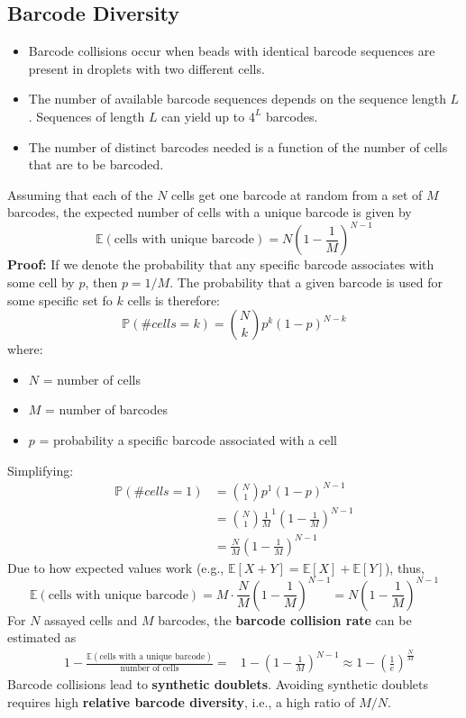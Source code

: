 \documentclass[10pt]{article}
\begin{document}
\subsection*{Barcode Diversity}
\begin{itemize}
    \item Barcode collisions occur when beads with identical barcode sequences are present in droplets with two different cells.
    \item The number of available barcode sequences depends on the sequence length $L$.  Sequences of length $L$ can yield up to $4^L$ barcodes.
    \item The number of distinct barcodes needed is a function of the number of cells that are to be barcoded.
\end{itemize}
Assuming that each of the $N$ cells get one barcode at random from a set of $M$ barcodes, the expected number of cells with a unique barcode is given by
\[\mathbb{E}(\text{cells with unique barcode}) = N \left(1 - \frac{1}{M}\right)^{N - 1}\]
\textbf{Proof:} If we denote the probability that any specific barcode associates with some cell by $p$, then $p = 1 / M$.  The probability that a given barcode is used for some specific set fo $k$ cells is therefore:
\[\mathbb{P}(\#cells = k) = {N \choose k} p^k(1 - p)^{N - k}\]
where:
\begin{itemize}
    \item $N$ = number of cells
    \item $M$ = number of barcodes
    \item $p$ = probability a specific barcode associated with a cell
\end{itemize}
Simplifying:
\begin{align*}
    \mathbb{P}(\#cells = 1) &= {N \choose 1} p^1 (1 - p)^{N - 1}\\
    &= {N \choose 1} {\frac{1}{M}}^1 \left(1 - \frac{1}{M}\right)^{N - 1}\\
    &= \frac{N}{M} \left(1 - \frac{1}{M}\right)^{N - 1}
\end{align*}
Due to how expected values work (e.g., $\mathbb{E}[X + Y] = \mathbb{E}[X] + \mathbb{E}[Y]$), thus,
\[\mathbb{E}(\text{cells with unique barcode}) = M \cdot \frac{N}{M} \left(1 - \frac{1}{M}\right)^{N - 1} = N\left(1 - \frac{1}{M}\right)^{N - 1}\]
For $N$ assayed cells and $M$ barcodes, the \textbf{barcode collision rate} can be estimated as
\begin{align*}
    & 1 - \frac{\mathbb{E}(\text{cells with a unique barcode})}{\text{number of cells}}
   =& 1 - \left(1 - \frac{1}{M}\right)^{N - 1} \approx 1 - \left(\frac{1}{e}\right)^{\frac{N}{M}}
\end{align*}
Barcode collisions lead to \textbf{synthetic doublets}.  Avoiding synthetic doublets requires high \textbf{relative barcode diversity}, i.e., a high ratio of $M/N$.
\end{document}
